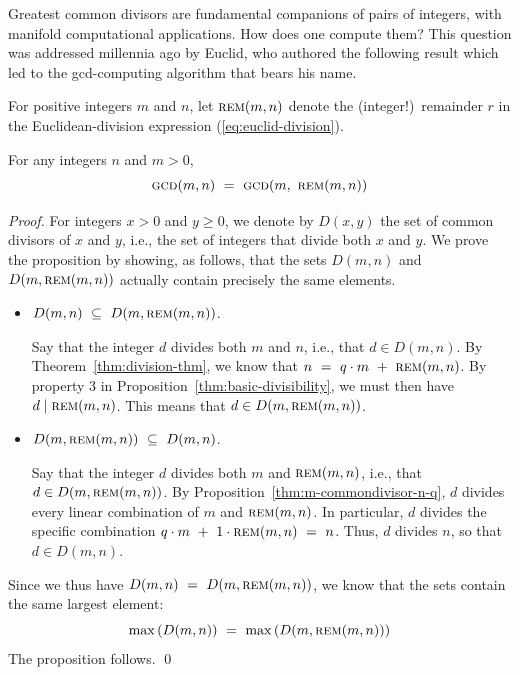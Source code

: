 
Greatest common divisors are fundamental companions of pairs of integers, with manifold computational applications.  How does one compute them?  This question was addressed millennia ago by Euclid, who authored the following result which led to the {\sc gcd}-computing algorithm that bears his name.

For positive integers $m$ and $n$, let $\mbox{\sc rem}(m,n)$ denote the (integer!)~remainder $r$ in the Euclidean-division expression (\ref{eq:euclid-division}).  


\begin{prop}
\label{thm:gcd-basis}
For any integers $n$ and $m > 0$,
\[ \mbox{\sc gcd}(m,n) \ = \  \mbox{\sc gcd}(m, \ \mbox{\sc rem}(m,n))  \]
\end{prop}

\begin{proof}
For integers $x > 0$ and $y \geq 0$, we denote by $D(x,y)$ the set of common divisors of $x$ and $y$, i.e., the set of integers that divide both $x$ and $y$.  We prove the proposition by showing, as follows, that the sets $D(m, n)$ and $D(m, \mbox{\sc rem}(m,n))$ actually contain precisely the same elements.
\begin{itemize}
\item 
$D(m, n) \ \subseteq \ D(m, \mbox{\sc rem}(m,n))$.

\smallskip

Say that the integer $d$ divides both $m$ and $n$, i.e., that $d \in D(m,n)$.  By Theorem~\ref{thm:division-thm}, we know that $n \ = \ q \cdot m \ + \ \mbox{\sc rem}(m,n)$.  By property 3 in Proposition~\ref{thm:basic-divisibility}, we must then have $d \mid
\mbox{\sc rem}(m,n)$.  This means that $d \in D(m, \mbox{\sc rem}(m,n))$.

\medskip\item 
$D(m, \mbox{\sc rem}(m,n)) \ \subseteq \ D(m,n)$.

\smallskip

Say that the integer $d$ divides both $m$ and $\mbox{\sc rem}(m,n)$, i.e., that $d \in D(m, \mbox{\sc rem}(m,n))$.  By Proposition~\ref{thm:m-commondivisor-n-q}, $d$ divides every linear
combination of $m$ and $\mbox{\sc rem}(m,n)$.  In particular, $d$ divides the specific combination $q \cdot m \ + \ 1 \cdot \mbox{\sc rem}(m,n) \ = \ n$.  Thus, $d$ divides $n$, so that $d \in D(m,n)$.
\end{itemize}
Since we thus have $D(m, n) \ = \ D(m, \mbox{\sc rem}(m,n))$, we know that the sets contain the same largest element:
\[ \max\left( D(m, n) \right) \ = \ \max\left( D(m, \mbox{\sc rem}(m,n)) \right) \]
The proposition follows.  \qed
\end{proof}


